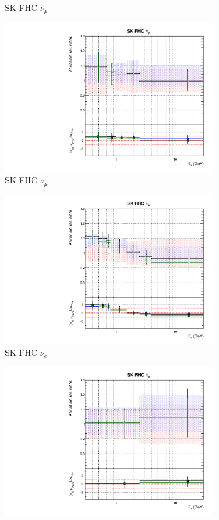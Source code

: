 \begin{figure}[!htbp]
\begin{subfigure}{0.45\textwidth}
  \caption{SK FHC $\nu_{\mu}$}
\end{subfigure}
\begin{subfigure}{0.45\textwidth}
  \centering
  \includegraphics[width=0.75\linewidth]{figs/polydataflux_9}
  \caption{SK FHC $\bar{\nu_{\mu}}$}
\end{subfigure}
\begin{subfigure}{0.45\textwidth}
  \centering
  \includegraphics[width=0.75\linewidth]{figs/polydataflux_10}
  \caption{SK FHC $\nu_e$}
\end{subfigure}
\begin{subfigure}{0.45\textwidth}
  \centering
  \includegraphics[width=0.75\linewidth]{figs/polydataflux_11}

\end{subfigure}
\end{figure}
